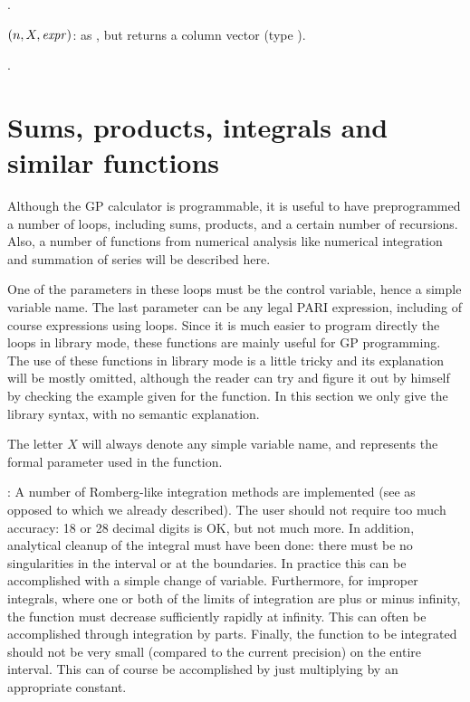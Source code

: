 .

$(n,X,\hbox{\it expr\/})$: as , but returns a
column vector (type ).

.

\section{Sums, products, integrals and similar functions}
\label{se:sums}

Although the GP calculator is programmable, it is useful to have
preprogrammed a number of loops, including sums, products, and a certain
number of recursions. Also, a number of functions from numerical analysis
like numerical integration and summation of series will be described here.

One of the parameters in these loops must be the control variable, hence a
simple variable name. The last parameter can be any legal PARI expression,
including of course expressions using loops. Since it is much easier to
program directly the loops in library mode, these functions are mainly
useful for GP programming. The use of these functions in library mode is a
little tricky and its explanation will be mostly omitted, although the
reader can try and figure it out by himself by checking the example given
for the  function. In this section we only give the library
syntax, with no semantic explanation.

The letter $X$ will always denote any simple variable name, and represents
the formal parameter used in the function.

: A number
of Romberg-like integration methods are implemented (see  as
opposed to  which we already described). The user should not
require too much accuracy: 18 or 28 decimal digits is OK, but not much more.
In addition, analytical cleanup of the integral must have been done: there
must be no singularities in the interval or at the boundaries. In practice
this can be accomplished with a simple change of variable. Furthermore, for
improper integrals, where one or both of the limits of integration are plus
or minus infinity, the function must decrease sufficiently rapidly at
infinity. This can often be accomplished through integration by parts.
Finally, the function to be integrated should not be very small
(compared to the current precision) on the entire interval. This can
of course be accomplished by just multiplying by an appropriate
constant.


